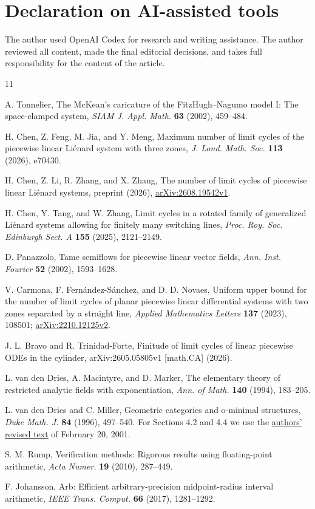 \documentclass[11pt]{article}
\theoremstyle{remark}
\begin{document}
\section*{Declaration on AI-assisted tools}

The author used OpenAI Codex for research and writing assistance.
The author reviewed all content,
made the final editorial decisions, and takes full responsibility for the
content of the article.

\begin{thebibliography}{11}
\raggedright
{}
A. Tonnelier, The McKean's caricature of the FitzHugh--Nagumo model I:
The space-clamped system, \emph{SIAM J. Appl. Math.} \textbf{63} (2002),
459--484.

H. Chen, Z. Feng, M. Jia, and Y. Meng, Maximum number of limit cycles of
the piecewise linear Li\'enard system with three zones,
\emph{J. Lond. Math. Soc.} \textbf{113} (2026), e70430.

H. Chen, Z. Li, R. Zhang, and X. Zhang, The number of limit cycles of
piecewise linear Li\'enard systems, preprint (2026),
\href{https://arxiv.org/abs/2608.19542v1}{arXiv:2608.19542v1}.

H. Chen, Y. Tang, and W. Zhang, Limit cycles in a rotated family of
generalized Li\'enard systems allowing for finitely many switching lines,
\emph{Proc. Roy. Soc. Edinburgh Sect. A} \textbf{155} (2025), 2121--2149.

D. Panazzolo, Tame semiflows for piecewise linear vector fields,
\emph{Ann. Inst. Fourier} \textbf{52} (2002), 1593--1628.

V. Carmona, F. Fern\'andez-S\'anchez, and D. D. Novaes, Uniform upper
bound for the number of limit cycles of planar piecewise linear
differential systems with two zones separated by a straight line,
\emph{Applied Mathematics Letters} \textbf{137} (2023), 108501;
\href{https://arxiv.org/abs/2210.12125v2}{arXiv:2210.12125v2}.

J. L. Bravo and R. Trinidad-Forte, Finitude of limit cycles of linear
piecewise ODEs in the cylinder, arXiv:2605.05805v1 [math.CA] (2026).

L. van den Dries, A. Macintyre, and D. Marker, The elementary theory of
restricted analytic fields with exponentiation, \emph{Ann. of Math.}
\textbf{140} (1994), 183--205.

L. van den Dries and C. Miller, Geometric categories and o-minimal
structures, \emph{Duke Math. J.} \textbf{84} (1996), 497--540.
For Sections 4.2 and 4.4 we use the
\href{https://people.math.osu.edu/miller.1987/newg.pdf}{authors' revised text}
of February 20, 2001.

S. M. Rump, Verification methods: Rigorous results using floating-point
arithmetic, \emph{Acta Numer.} \textbf{19} (2010), 287--449.

F. Johansson, Arb: Efficient arbitrary-precision midpoint-radius interval
arithmetic, \emph{IEEE Trans. Comput.} \textbf{66} (2017), 1281--1292.
\end{thebibliography}
\end{document}
